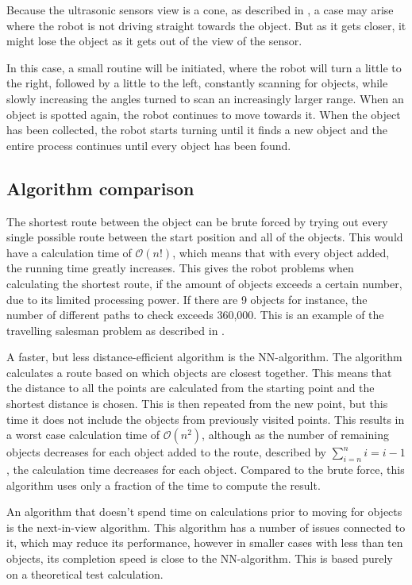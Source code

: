 Because the ultrasonic sensors view is a cone, as described in , a case may arise where the robot is not driving straight towards the object. But as it gets closer, it might lose the object as it gets out of the view of the sensor.

In this case, a small routine will be initiated, where the robot will turn a little to the right, followed by a little to the left, constantly scanning for objects, while slowly increasing the angles turned to scan an increasingly larger range. When an object is spotted again, the robot continues to move towards it. When the object has been collected, the robot starts turning until it finds a new object and the entire process continues until every object has been found.


\subsection{Algorithm comparison} \label{sec:algorithm-desc}

The shortest route between the object can be brute forced by trying out every single possible route between the start position and all of the objects. This would have a calculation time of $\mathcal{O}(n!)$, which means that with every object added, the running time greatly increases. This gives the robot problems when calculating the shortest route, if the amount of objects exceeds a certain number, due to its limited processing power. If there are 9 objects for instance, the number of different paths to check exceeds 360,000. This is an example of the travelling salesman problem as described in . 

A faster, but less distance-efficient algorithm is the NN-algorithm. The algorithm calculates a route based on which objects are closest together. This means that the distance to all the points are calculated from the starting point and the shortest distance is chosen. This is then repeated from the new point, but this time it does not include the objects from previously visited points. This results in a worst case calculation time of $\mathcal{O}(n^2)$, although as the number of remaining objects decreases for each object added to the route, described by $\sum\limits_{i=n}^n i = i - 1$, the calculation time decreases for each object. Compared to the brute force, this algorithm uses only a fraction of the time to compute the result. 

An algorithm that doesn't spend time on calculations prior to moving for objects is the next-in-view algorithm. This algorithm has a number of issues connected to it, which may reduce its performance, however in smaller cases with less than ten objects, its completion speed is close to the NN-algorithm. This is based purely on a theoretical test calculation.

